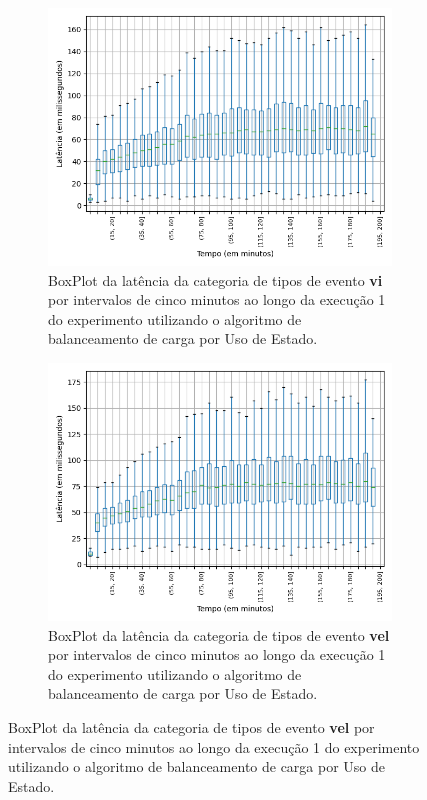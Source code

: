 \begin{figure}
\begin{subfigure}{.5\textwidth}
\centering
\includegraphics[width=\textwidth]{figuras/graphics/boxplot_5-dez-su_vi.png}
\caption{BoxPlot da latência da categoria de tipos de evento \textbf{vi} por intervalos de cinco minutos ao longo da execução 1 do experimento utilizando o algoritmo de balanceamento de carga por Uso de Estado.}
\label{fig:BoxPlot_vi_SU_1}
\end{subfigure}%
\centering
\begin{subfigure}{.5\textwidth}
\centering
\includegraphics[width=\textwidth]{figuras/graphics/boxplot_5-dez-su_vel.png}
\caption{BoxPlot da latência da categoria de tipos de evento \textbf{vel} por intervalos de cinco minutos ao longo da execução 1 do experimento utilizando o algoritmo de balanceamento de carga por Uso de Estado.}
\label{fig:BoxPlot_vel_SU_1}
\end{subfigure}%


\end{figure}
